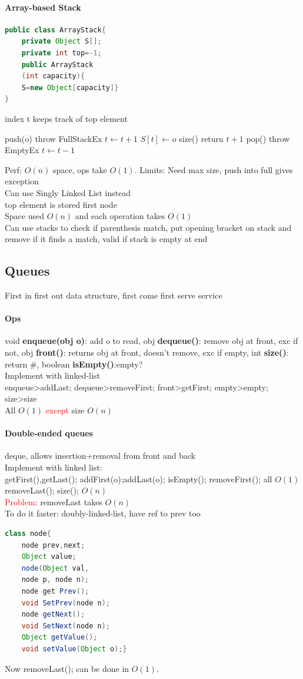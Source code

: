 \paragraph{Array-based Stack}
\begin{lstlisting}[language=java]
public class ArrayStack{
	private Object S[];
	private int top=-1;
	public ArrayStack
	(int capacity){
	S=new Object[capacity]}
}
\end{lstlisting}
index t keeps track of top element
\begin{algorithmic}
	\State push(o)
		\State throw FullStackEx
	\Else
	\State $t\gets t+1$
	\State $S[t] \gets o$
	\EndIf
	\State size()
	\State return $t+1$
	\State pop()
		\State throw EmptyEx
	\Else $t \gets t-1$
	\EndIf
\end{algorithmic}
Perf: $O(n)$ space, ops take $O(1)$. Limits: Need max size, push into full gives exception
\\ Can use Singly Linked List instead
\\ top element is stored first node
\\ Space used $O(n)$ and each operation takes $O(1)$
\\ Can use stacks to check if parenthesis match, put opening bracket on stack and remove if it finds a match, valid if stack is empty at end
\subsection{Queues} First in first out data structure, first come first serve service
\paragraph{Ops} void\textbf{ enqueue(obj o)}: add o to read, obj \textbf{dequeue()}: remove obj at front, exc if not, obj \textbf{front()}: returns obj at front, doesn't remove, exc if empty, int\textbf{ size()}: return \#, boolean \textbf{isEmpty()}:empty?
\\ Implement with linked-list
\\enqueue>addLast; dequeue>removeFirst; front>getFirst; empty>empty; size>size
\\ All $O(1)$ \textcolor{Red}{except} size $O(n)$
\paragraph{Double-ended queues} deque, allows insertion+removal from front and back
\\ Implement with linked list:
\\ getFirst(),getLast(); addFirst(o);addLast(o); isEmpty(); removeFirst(); all $O(1)$
\\removeLast(); size(); $O(n)$
\\\textcolor{Red}{Problem}: removeLast takes $O(n)$
\\ To do it faster: doubly-linked-list, have ref to prev too
\begin{lstlisting}[language=java]
class node{
	node prev,next;
	Object value;
	node(Object val,
	node p, node n);
	node get Prev(); 
	void SetPrev(node n);
	node getNext(); 
	void SetNext(node n);
	Object getValue(); 
	void setValue(Object o);}
\end{lstlisting}
Now removeLast(); can be done in $O(1)$.
